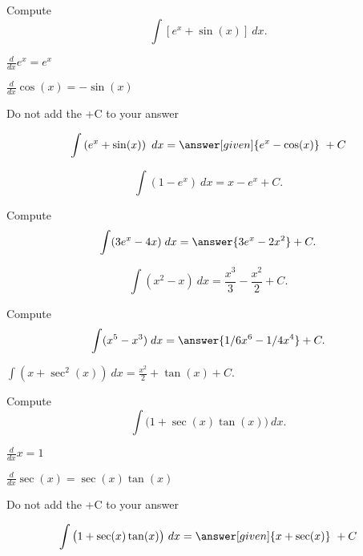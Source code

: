 \documentclass{ximera}
\begin{document}
\begin{problem} %
Compute
\[
\int \left[e^x + \sin(x) \right] \ dx.
\]

\begin{hint}
$\frac{d}{dx} e^x = e^x$
\end{hint}
\begin{hint}
$\frac{d}{dx} \cos(x) = -\sin(x)$
\end{hint}
\begin{hint}
\begin{center}
Do not add the +C to your answer
\end{center}
\end{hint}

\[
\int \left(e^x + \sin(x) \right) \ dx =
\answer[given]{e^x -\cos(x)} \ +  C
\]
\end{problem}


\begin{example} %
\[
\int \left(1 - e^x\right) \ dx = x - e^x + C.
\]
\end{example}

\begin{problem}
Compute
\[
\int (3e^x - 4x) \; dx = \answer{3e^x - 2x^2} + C.
\]
\end{problem}



\begin{example} %
\[
\int \left(x^2 - x\right) \ dx = \dfrac{x^3}{3} - \dfrac{x^2}{2} + C.
\]
\end{example}


\begin{problem}
Compute
\[
\int (x^5 - x^3) \; dx = \answer{1/6 x^6 - 1/4 x^4} + C.
\]
\end{problem}




\begin{example} %
$\int \left(x + \sec^2(x)\right) \ dx = \frac{x^2}{2} + \tan(x) + C.$
\end{example}

\begin{problem} %
Compute
\[
\int \big(1 + \sec(x)\tan(x) \big) \ dx.
\]

\begin{hint}
$\frac{d}{dx} x = 1$
\end{hint}
\begin{hint}
$\frac{d}{dx} \sec(x) = \sec(x)\tan(x)$
\end{hint}
\begin{hint}
\begin{center}
Do not add the +C to your answer
\end{center}
\end{hint}

\[
\int \big(1 + \sec(x)\tan(x) \big) \ dx =
\answer[given]{x + \sec(x)} \ +  C
\]
\end{problem}
\end{document}
